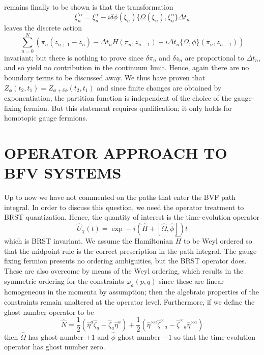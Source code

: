 \documentclass[a4paper,10pt]{article}
\begin{document}
remains finally to be shown is that the transformation
$$\xi^{\prime\alpha}_n=\xi^{\alpha}_n-
i\delta\phi(\xi_n)\{\Omega(\xi_n),\xi^{\alpha}_n\}\Delta t_n$$
leaves the discrete action 
$$\sum_{n=0}^N\left(\pi_n(z_{n+1}-z_n)-\Delta t_nH(\pi_n,z_{n-1})-i\Delta 
t_n\{\Omega,\phi\}(\pi_n,z_{n-1})\right)$$
invariant; but there is nothing to prove since $\delta\pi_n$ and $\delta z_n$ are 
proportional to $\Delta t_n$, and so yield no contribution in the continuum limit. Hence, 
again there are no boundary terms to be discussed away. We thus have proven that 
$Z_{\phi}(t_2,t_1)=Z_{\phi+\delta\phi}(t_2,t_1)$ 
and since finite changes are obtained by exponentiation, the partition function is 
independent of the choice of the gauge-fixing fermion. But this statement requires  
qualification; it only holds for homotopic gauge fermions.
 
\section{OPERATOR APPROACH TO BFV SYSTEMS}

Up to now we have not commented on the paths that enter the BVF path integral. In order 
to discuss this question, we need the operator treatment to BRST quantization. Hence, the 
quantity of interest is the time-evolution operator
\begin{equation}
\hat{U}_{\chi}(t)=\exp -i(\hat{H}+[\hat{\Omega},\hat{\phi}])t
\end{equation}
which is BRST invariant. We assume the Hamiltonian $\hat{H}$ to be Weyl ordered so that 
the midpoint rule is the correct prescription in the path integral. The gauge-fixing 
fermion presents no ordering ambiguities, but the BRST operator does. These are also 
overcome by means of the Weyl ordering, which results in the symmetric ordering for the 
constraints $\varphi_a(p,q)$ since these are linear homogeneous in the momenta by 
assumption; then the algebraic properties of the constraints remain unaltered at the 
operator level. Furthermore, if we define the ghost number operator to be 
\begin{equation}
\hat{N}=\frac{1}{2}(\hat{\eta}^a\hat{\zeta}_a-\hat{\zeta}_a\hat{\eta}^a)+
\frac{1}{2}(\hat{\eta}^{\times a}\hat{\zeta}^{\times}{\!}_a-
\hat{\zeta}^{\times}{\!}_a\hat{\eta}^{\times a})
\end{equation}
then $\hat{\Omega}$ has ghost number $+1$ and $\hat{\phi}$ ghost number $-1$ so that the 
time-evolution operator has ghost number zero. 
\end{document}
